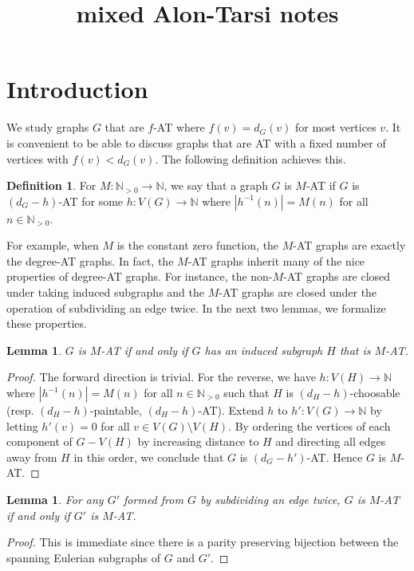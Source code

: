 \documentclass[12pt]{article}
\theoremstyle{plain}
\newtheorem{lem}[thm]{Lemma}
\theoremstyle{definition}
\newtheorem{defn}{Definition}
\theoremstyle{remark}
\newcommand{\IN}{\mathbb{N}}
\newcommand{\card}[1]{\left|#1\right|}
\newcommand{\func}[3]{#1\colon #2 \rightarrow #3}
\begin{document}
\title{mixed Alon-Tarsi notes}
\author{}
\maketitle

\section{Introduction}

We study graphs $G$ that are $f$-AT where $f(v) = d_G(v)$ for most vertices $v$.  It is convenient to be able to discuss graphs that are AT with a fixed number of vertices with $f(v) < d_G(v)$.  The following definition achieves this.
\begin{defn}
	For $\func{M}{\IN_{>0}}{\IN}$, we say that a graph $G$ is $M$-AT if $G$ is $(d_G - h)$-AT for some $\func{h}{V(G)}{\IN}$ where $\card{h^{-1}(n)} = M(n)$ for all $n \in \IN_{>0}$.
\end{defn}

For example, when $M$ is the constant zero function, the $M$-AT graphs are exactly the degree-AT graphs.  In fact, the $M$-AT graphs inherit many of the nice properties of degree-AT graphs. For instance, the non-$M$-AT graphs are closed under taking induced subgraphs and the $M$-AT graphs are closed under the operation of subdividing an edge twice.  In the next two lemmas, we formalize these properties.

\begin{lem}\label{InducedSubgraph}
	$G$ is $M$-AT if and only if $G$ has an induced subgraph $H$ that is $M$-AT.
\end{lem}
\begin{proof}
	The forward direction is trivial.  For the reverse, we have $\func{h}{V(H)}{\IN}$ where $\card{h^{-1}(n)} = M(n)$ for all $n \in \IN_{>0}$ such that $H$ is $(d_H - h)$-choosable (resp. $(d_H - h)$-paintable, $(d_H - h)$-AT).  Extend $h$ to $\func{h'}{V(G)}{\IN}$ by letting $h'(v) = 0$ for all $v \in V(G) \setminus V(H)$.  By ordering the vertices of each component of $G - V(H)$ by increasing distance to $H$ and directing all edges away from $H$ in this order, we conclude that $G$ is $(d_G - h')$-AT.  Hence $G$ is $M$-AT.
\end{proof}

\begin{lem}\label{SubdivideTwice}
	For any $G'$ formed from $G$ by subdividing an edge twice, $G$ is $M$-AT if and only if $G'$ is $M$-AT.
\end{lem}
\begin{proof}
	This is immediate since there is a parity preserving bijection between the spanning Eulerian subgraphs of $G$ and $G'$. 
\end{proof}
\end{document}
